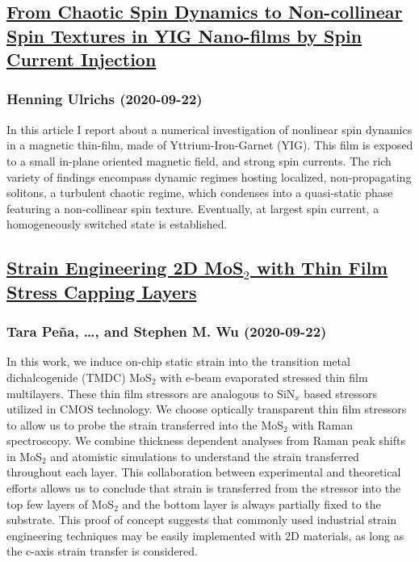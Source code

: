 {\subsection*{\href{http://arxiv.org/abs/2009.10628v1}{From Chaotic Spin Dynamics to Non-collinear Spin Textures in YIG  Nano-films by Spin Current Injection}}
\subsubsection*{Henning Ulrichs (2020-09-22)}
In this article I report about a numerical investigation of nonlinear spin
dynamics in a magnetic thin-film, made of Yttrium-Iron-Garnet (YIG). This film
is exposed to a small in-plane oriented magnetic field, and strong spin
currents. The rich variety of findings encompass dynamic regimes hosting
localized, non-propagating solitons, a turbulent chaotic regime, which
condenses into a quasi-static phase featuring a non-collinear spin texture.
Eventually, at largest spin current, a homogeneously switched state is
established.

\subsection*{\href{http://arxiv.org/abs/2009.10626v1}{Strain Engineering 2D MoS$_{2}$ with Thin Film Stress Capping Layers}}
\subsubsection*{Tara Peña, \dots, and Stephen M. Wu (2020-09-22)}
In this work, we induce on-chip static strain into the transition metal
dichalcogenide (TMDC) MoS$_{2}$ with e-beam evaporated stressed thin film
multilayers. These thin film stressors are analogous to SiN$_{x}$ based
stressors utilized in CMOS technology. We choose optically transparent thin
film stressors to allow us to probe the strain transferred into the MoS$_{2}$
with Raman spectroscopy. We combine thickness dependent analyses from Raman
peak shifts in MoS$_{2}$ and atomistic simulations to understand the strain
transferred throughout each layer. This collaboration between experimental and
theoretical efforts allows us to conclude that strain is transferred from the
stressor into the top few layers of MoS$_{2}$ and the bottom layer is always
partially fixed to the substrate. This proof of concept suggests that commonly
used industrial strain engineering techniques may be easily implemented with 2D
materials, as long as the c-axis strain transfer is considered.

}
